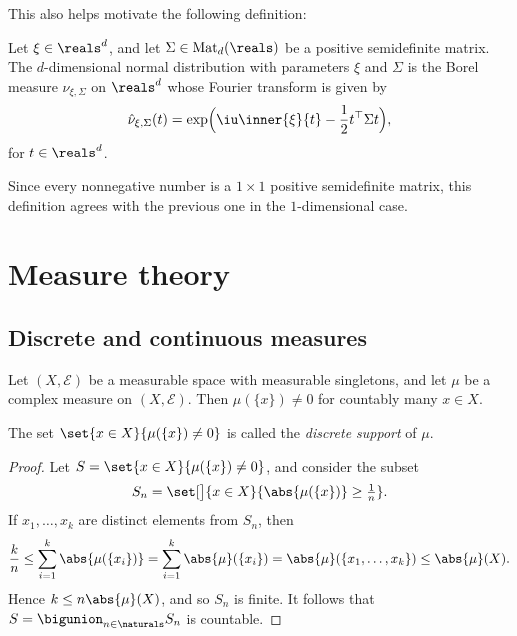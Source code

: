 \documentclass[article, a4paper, 11pt, oneside]{memoir}
\numberwithin{equation}{chapter}
\newcommand{\calE}{\mathcal{E}}
\begin{document}

This also helps motivate the following definition:

\begin{definition}
    Let $\xi \in \reals^d$, and let $\Sigma \in \mathrm{Mat}_d(\reals)$ be a positive semidefinite matrix. The $d$-dimensional normal distribution with parameters $\xi$ and $\Sigma$ is the Borel measure $\nu_{\xi,\Sigma}$ on $\reals^d$ whose Fourier transform is given by
    \begin{equation*}
        \hat{\nu}_{\xi,\Sigma}(t)
            = \exp \Bigl( \iu \inner{\xi}{t} - \frac{1}{2} t\trans \Sigma t \Bigr),
    \end{equation*}
    for $t \in \reals^d$.
\end{definition}
%
Since every nonnegative number is a $1 \times 1$ positive semidefinite matrix, this definition agrees with the previous one in the $1$-dimensional case.


\chapter{Measure theory}

\section{Discrete and continuous measures}


\begin{lemma}
    Let $(X,\calE)$ be a measurable space with measurable singletons, and let $\mu$ be a complex measure on $(X,\calE)$. Then $\mu(\{x\}) \neq 0$ for countably many $x \in X$.
\end{lemma}
%
The set $\set{x \in X}{\mu(\{x\}) \neq 0}$ is called the \emph{discrete support} of $\mu$.

\begin{proof}
    Let $S = \set{x \in X}{\mu(\{x\}) \neq 0}$, and consider the subset
    \begin{equation*}
        S_n
            = \set[\big]{x \in X}{\abs{\mu(\{x\})} \geq \tfrac{1}{n}}.
    \end{equation*}
    If $x_1, \ldots, x_k$ are distinct elements from $S_n$, then
    \begin{equation*}
        \frac{k}{n}
            \leq \sum_{i=1}^k \abs{\mu(\{x_i\})}
            = \sum_{i=1}^k \abs{\mu}(\{x_i\})
            = \abs{\mu}(\{x_1, \ldots, x_k\})
            \leq \abs{\mu}(X).
    \end{equation*}
    Hence $k \leq n \abs{\mu}(X)$, and so $S_n$ is finite. It follows that $S = \bigunion_{n \in \naturals} S_n$ is countable.
\end{proof}
\end{document}
